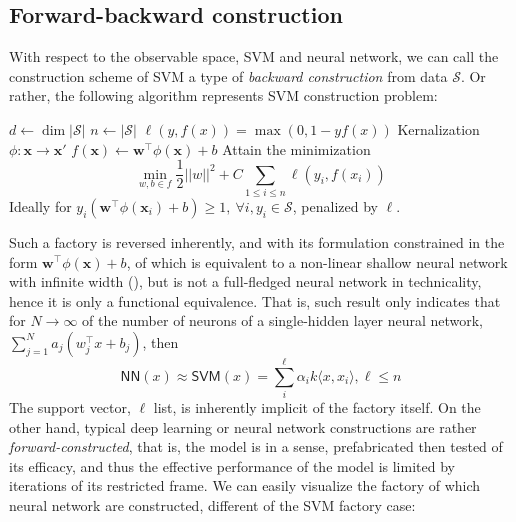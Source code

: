 \documentclass[10pt]{article} %
\begin{document}
\subsection{Forward-backward construction}

With respect to the observable space, SVM and neural network, we can call the construction scheme of SVM a type of \textit{backward construction} from data $\mathcal{S}$. Or rather, the following algorithm represents SVM construction problem: 

\begin{algorithm}[htb]
    \renewcommand{\algorithmcfname}{Factory}
    \caption{Support Vector Machine - backward construction.}
    \Begin
    {
        $d\gets \dim|\mathcal{S}|$\;
        $n\gets|\mathcal{S}|$\;
        $\ell(y,f(x))=\max(0,1-yf(x))$\;
        Kernalization $\phi:\mathbf{x}\to\mathbf{x}'$\;
        $f(\mathbf{x})\gets \mathbf{w}^{\top}\phi(\mathbf{x})+b$\;
        \Objective
        {
            Attain the minimization 
            \begin{equation}
                \min_{w,b\in f} \frac{1}{2}||w||^{2} + C \sum_{1\leq i\leq n}\ell(y_{i},f(x_{i}))
            \end{equation}
            Ideally for $y_{i}(\mathbf{w}^{\top}\phi(\mathbf{x}_i)+b)\geq 1, \: \forall i, y_{i}\in\mathcal{S}$, penalized by $\ell$.\;
        }
    }
    \label{algo:algo_SVM_no_kernel}
\end{algorithm}

Such a factory is reversed inherently, and with its formulation constrained in the form $\mathbf{w}^{\top}\phi(\mathbf{x})+b$, of which is equivalent to a non-linear shallow neural network with infinite width (\cite{wang2017research,chen2021equivalence}), but is not a full-fledged neural network in technicality, hence it is only a functional equivalence. That is, such result only indicates that for $N\to \infty$ of the number of neurons of a single-hidden layer neural network, $\sum_{j=1}^{N}a_{j}(w_{j}^{\top}x+b_{j})$, then 
\begin{equation}
    \mathsf{NN}(x) \approx \mathsf{SVM}(x) = \sum^{\ell}_{i}\alpha_{i}k\langle x,x_{i}\rangle, \ell \leq n
\end{equation}
The support vector, $\ell$ list, is inherently implicit of the factory itself. On the other hand, typical deep learning or neural network constructions are rather \textit{forward-constructed}, that is, the model is in a sense, prefabricated then tested of its efficacy, and thus the effective performance of the model is limited by iterations of its restricted frame. We can easily visualize the factory of which neural network are constructed, different of the SVM factory case:
\end{document}
